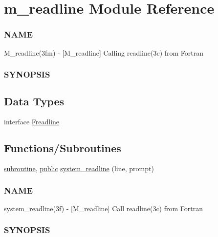 \hypertarget{namespacem__readline}{}\section{m\+\_\+readline Module Reference}
\label{namespacem__readline}


\subsubsection*{N\+A\+ME}

M\+\_\+readline(3fm) -\/ \mbox{[}M\+\_\+readline\mbox{]} Calling readline(3c) from Fortran \subsubsection*{S\+Y\+N\+O\+P\+S\+IS} 


\subsection*{Data Types}
\begin{DoxyCompactItemize}
\item 
interface \hyperlink{interfacem__readline_1_1Freadline}{Freadline}
\end{DoxyCompactItemize}
\subsection*{Functions/\+Subroutines}
\begin{DoxyCompactItemize}
\item 
\hyperlink{M__stopwatch_83_8txt_acfbcff50169d691ff02d4a123ed70482}{subroutine}, \hyperlink{M__stopwatch_83_8txt_a2f74811300c361e53b430611a7d1769f}{public} \hyperlink{namespacem__readline_a6eae368d34bd43ead64623b2d6d10ae0}{system\+\_\+readline} (line, prompt)
\begin{DoxyCompactList}\small\item\em \subsubsection*{N\+A\+ME}

system\+\_\+readline(3f) -\/ \mbox{[}M\+\_\+readline\mbox{]} Call readline(3c) from Fortran \subsubsection*{S\+Y\+N\+O\+P\+S\+IS}\end{DoxyCompactList}\end{DoxyCompactItemize}


